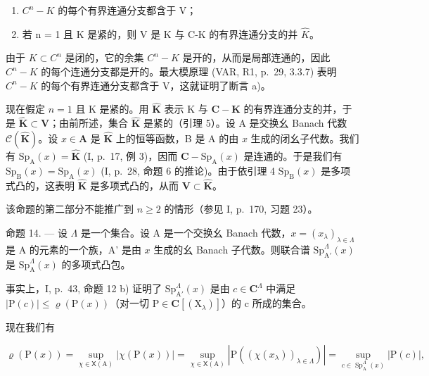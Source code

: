 \begin{enumerate}
\def\labelenumi{\alph{enumi})}
\item
  \(C^{n} - K\) 的每个有界连通分支都含于 V；
\item
  若 n = 1 且 K 是紧的，则 V 是 K 与 C-K 的有界连通分支的并 \(\widehat{K}\)。
\end{enumerate}

由于 \(K \subset C^{n}\) 是闭的，它的余集 \(C^{n}-K\) 是开的，从而是局部连通的，因此 \(C^{n}-K\) 的每个连通分支都是开的。最大模原理 (VAR, R1, p.~29, 3.3.7) 表明 \(C^{n}-K\) 的每个有界连通分支都含于 V，这就证明了断言 a)。

现在假定 \(n = 1\) 且 K 是紧的。用 \(\widehat{\mathbf{K}}\) 表示 K 与 \(\mathbf{C} - \mathbf{K}\) 的有界连通分支的并，于是 \(\widehat{\mathbf{K}} \subset \mathbf{V}\)；由前所述，集合 \(\widehat{\mathbf{K}}\) 是紧的（引理 5）。设 A 是交换幺 Banach 代数 \(\mathcal{C}(\widehat{\mathbf{K}})\)。设 \(x \in \mathbf{A}\) 是 \(\widehat{\mathbf{K}}\) 上的恒等函数，B 是 A 的由 \(x\) 生成的闭幺子代数。我们有 \(\mathrm{Sp}_{\mathrm{A}}(x) = \widehat{\mathbf{K}}\) (I, p.~17, 例 3)，因而 \(\mathbf{C} - \mathrm{Sp}_{\mathrm{A}}(x)\) 是连通的。于是我们有 \(\mathrm{Sp}_{\mathrm{B}}(x) = \mathrm{Sp}_{\mathrm{A}}(x)\) (I, p.~28, 命题 6 的推论)。由于依引理 4 \(\mathrm{Sp}_{\mathrm{B}}(x)\) 是多项式凸的，这表明 \(\widehat{\mathbf{K}}\) 是多项式凸的，从而 \(\mathbf{V} \subset \widehat{\mathbf{K}}\)。

该命题的第二部分不能推广到 \(n \geqslant 2\) 的情形（参见 I, p.~170, 习题 23）。

命题 14. --- 设 \(\Lambda\) 是一个集合。设 A 是一个交换幺 Banach 代数，\(x = (x_{\lambda})_{\lambda \in \Lambda}\) 是 A 的元素的一个族，A' 是由 \(x\) 生成的幺 Banach 子代数。则联合谱 \(\mathrm{Sp}_{\mathrm{A}'}^{\Lambda}(x)\) 是 \(\mathrm{Sp}_{\mathrm{A}}^{\Lambda}(x)\) 的多项式凸包。

事实上，I, p.~43, 命题 12 b) 证明了 \(\mathrm{Sp}_{\mathrm{A}'}^{\Lambda}(x)\) 是由 \(c \in \mathbf{C}^{\Lambda}\) 中满足 \(|\mathrm{P}(c)| \leqslant \varrho(\mathrm{P}(x))\)（对一切 \(\mathrm{P} \in \mathbf{C}[(\mathrm{X}_{\lambda})]\)）的 c 所成的集合。

现在我们有

\[
\varrho (\mathrm{P} (x)) = \sup _ {\chi \in \mathsf {X} (\mathrm{A})} | \chi (\mathrm{P} (x)) | = \sup _ {\chi \in \mathsf {X} (\mathrm{A})} | \mathrm{P} ((\chi (x _ {\lambda})) _ {\lambda \in \Lambda}) | = \sup _ {c \in \operatorname{Sp} _ {\mathrm{A}} ^ {\Lambda} (x)} | \mathrm{P} (c) |,
\]

